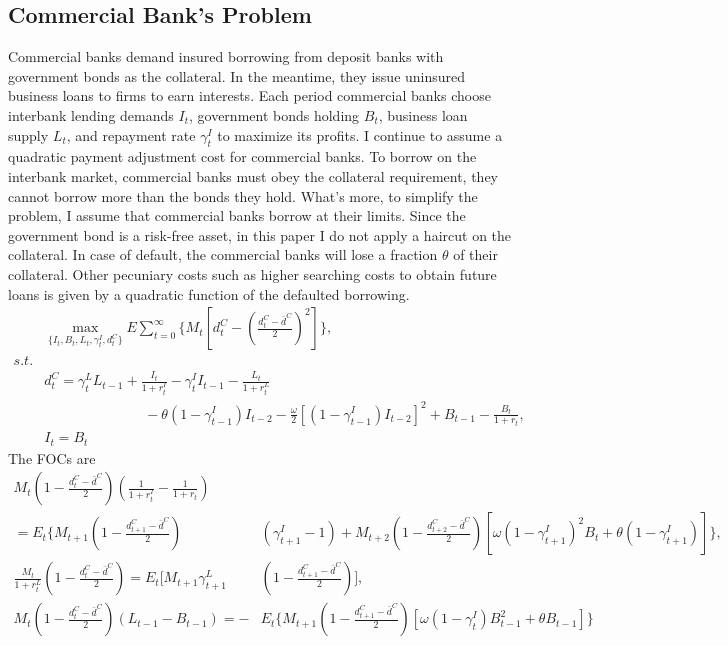 \documentclass[12pt]{article}
\begin{document}
\subsection{Commercial Bank's Problem}
Commercial banks demand insured borrowing from deposit banks with government bonds as the collateral. In the meantime, they issue uninsured business loans to firms to earn interests.
Each period commercial banks choose interbank lending demands $I_t$, government bonds holding $B_t$, business loan supply $L_t$, and repayment rate $\gamma_t^I$ to maximize its profits. 
I continue to assume a quadratic payment adjustment cost for commercial banks. To borrow on the interbank market, commercial banks must obey the collateral requirement, they cannot borrow
more than the bonds they hold. What's more, to simplify the problem, I assume that commercial banks borrow at their limits. 
Since the government bond is a risk-free asset, in this paper I do not apply a haircut on the collateral.
In case of default, the commercial banks will lose a fraction $\theta$ of their collateral. Other pecuniary costs such as higher searching costs to obtain future loans is given by a quadratic function of the defaulted borrowing.
\begin{align}
  &\max_{\{I_t, B_t, L_t, \gamma_t^I, d_t^C\}} E \sum_{t=0}^{\infty} \{M_t[d_t^C-(\frac{d_t^C-\bar{d}^C}{2})^2]\} ,\\
  s.t. \nonumber \\
  &d_t^C=\gamma_t^L L_{t-1}+\frac{I_t}{1+r_t^I}-\gamma_t^I I_{t-1}-\frac{L_t}{1+r_t^L} \nonumber \\
  & \hspace{3cm}-\theta(1-\gamma_{t-1}^I)I_{t-2}-\frac{\omega}{2}[(1-\gamma_{t-1}^I)I_{t-2}]^2+B_{t-1}-\frac{B_t}{1+r_t}, \\
  &I_t= B_t 
\end{align}
The FOCs are 
\begin{align}
  M_t (1-\frac{d_t^C-\bar{d}^C}{2})(\frac{1}{1+r_t^I}-\frac{1}{1+r_t})& \nonumber \\
  = E_t \bigg\{ M_{t+1} (1-\frac{d_{t+1}^C-\bar{d}^C}{2})&(\gamma_{t+1}^I-1)+ M_{t+2} (1-\frac{d_{t+2}^C-\bar{d}^C}{2}) [\omega(1-\gamma_{t+1}^I)^2B_t+\theta(1-\gamma_{t+1}^I)] \bigg\}, \\
  \frac{M_t}{1+r_t^L}(1-\frac{d_t^C-\bar{d}^C}{2})=E_t \big[M_{t+1} \gamma_{t+1}^L &(1-\frac{d_{t+1}^C-\bar{d}^C}{2})\big], \\
  M_t (1-\frac{d_t^C-\bar{d}^C}{2})(L_{t-1}-B_{t-1})=-& E_t \bigg\{ M_{t+1} (1 -\frac{d_{t+1}^C-\bar{d}^C}{2})[\omega(1-\gamma_t^I)B_{t-1}^2 + \theta B_{t-1}] \bigg\}
\end{align}
\end{document}
